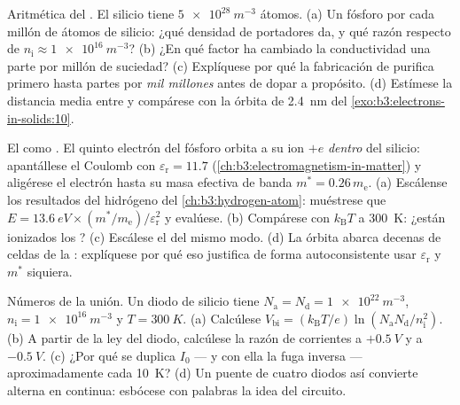 \begin{exercise}[$\star\star$]\label{exo:b3:electrons-in-solids:9}
Aritmética del . El silicio tiene $\qty{5e28}{m^{-3}}$ átomos. (a) Un
fósforo por cada millón de átomos de silicio: ¿qué densidad de portadores da, y
qué razón respecto de $n_{\text{i}} \approx \qty{1e16}{m^{-3}}$? (b) ¿En
qué factor ha cambiado la conductividad una parte por millón de suciedad? (c)
Explíquese por qué la fabricación de  purifica primero hasta partes
por \emph{mil millones} antes de dopar a propósito. (d) Estímese la
distancia media entre  y compárese con la
órbita de \qty{2.4}{nm} del \cref{exo:b3:electrons-in-solids:10}.
\end{exercise}

\begin{exercise}[$\star\star\star$]\label{exo:b3:electrons-in-solids:10}
El  como . El quinto electrón del fósforo
orbita a su ion $+e$ \emph{dentro} del silicio: apantállese el Coulomb con
$\varepsilon_{\text{r}} = 11.7$
(\cref{ch:b3:electromagnetism-in-matter}) y aligérese el
electrón hasta su masa efectiva de banda $m^* = 0.26\,m_{\text{e}}$.
(a) Escálense los resultados del hidrógeno del \cref{ch:b3:hydrogen-atom}:
muéstrese que $E = \qty{13.6}{eV}\times(m^*/m_{\text{e}})/
\varepsilon_{\text{r}}^2$ y evalúese. (b) Compárese con
$k_{\text{B}}T$ a \qty{300}{K}: ¿están ionizados los ? (c) Escálese
el  del mismo modo. (d) La órbita abarca decenas de
celdas de la : explíquese por qué eso justifica de forma autoconsistente
usar $\varepsilon_{\text{r}}$ y $m^*$ siquiera.
\end{exercise}

\begin{exercise}[$\star\star\star$]\label{exo:b3:electrons-in-solids:11}
Números de la unión. Un diodo de silicio tiene $N_{\text{a}} =
N_{\text{d}} = \qty{1e22}{m^{-3}}$, $n_{\text{i}} =
\qty{1e16}{m^{-3}}$ y $T = \qty{300}{K}$. (a) Calcúlese
$V_{\text{bi}} = (k_{\text{B}}T/e)\ln(N_{\text{a}}N_{\text{d}}/
n_{\text{i}}^2)$. (b) A partir de la ley del diodo, calcúlese la razón de
corrientes a $+\qty{0.5}{V}$ y a $-\qty{0.5}{V}$. (c) ¿Por qué se
duplica $I_0$ --- y con ella la fuga inversa --- aproximadamente cada
\qty{10}{K}? (d) Un puente de cuatro diodos así convierte alterna en continua:
esbócese con palabras la idea del circuito.
\end{exercise}

